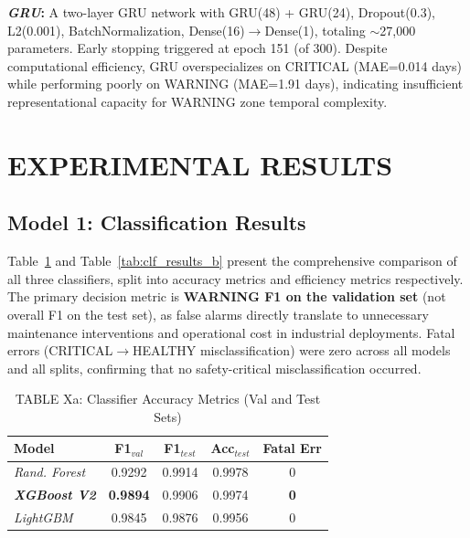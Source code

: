 \documentclass[conference]{IEEEtran}
\begin{document}
\textbf{\textit{GRU}:} A two-layer GRU network with GRU(48) + GRU(24), Dropout(0.3), L2(0.001), BatchNormalization, Dense(16)$\rightarrow$Dense(1), totaling $\sim$27,000 parameters. Early stopping triggered at epoch 151 (of 300). Despite computational efficiency, GRU overspecializes on CRITICAL (MAE=0.014 days) while performing poorly on WARNING (MAE=1.91 days), indicating insufficient representational capacity for WARNING zone temporal complexity.

\section{EXPERIMENTAL RESULTS}

\subsection{Model 1: Classification Results}

Table~\ref{tab:clf_results_a} and Table~\ref{tab:clf_results_b} present the comprehensive comparison of all three classifiers, split into accuracy metrics and efficiency metrics respectively. The primary decision metric is \textbf{WARNING F1 on the validation set} (not overall F1 on the test set), as false alarms directly translate to unnecessary maintenance interventions and operational cost in industrial deployments. Fatal errors (CRITICAL$\rightarrow$HEALTHY misclassification) were zero across all models and all splits, confirming that no safety-critical misclassification occurred.

\begin{table}[htbp]
\caption{TABLE Xa: Classifier Accuracy Metrics (Val and Test Sets)}
\centering
\begin{tabular}{lcccc}
\hline
\textbf{Model} & \textbf{F1$_{val}$} & \textbf{F1$_{test}$} & \textbf{Acc$_{test}$} & \textbf{Fatal Err} \\
\hline
\textit{Rand. Forest}    & 0.9292 & 0.9914 & 0.9978 & 0 \\
\textbf{\textit{XGBoost V2}} & \textbf{0.9894} & 0.9906 & 0.9974 & \textbf{0} \\
\textit{LightGBM}        & 0.9845 & 0.9876 & 0.9956 & 0 \\
\hline
\end{tabular}
\label{tab:clf_results_a}
\end{table}
\end{document}
